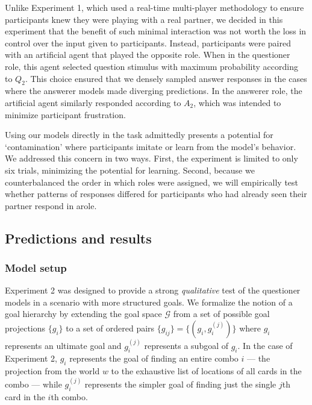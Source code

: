 \documentclass[11pt, floatsintext]{apa6}
\begin{document}
Unlike Experiment 1, which used a real-time multi-player methodology to ensure participants knew they were playing with a real partner, we decided in this experiment that the benefit of such minimal interaction was not worth the loss in control over the input given to participants.
Instead, participants were paired with an artificial agent that played the opposite role.
When in the questioner role, this agent selected question stimulus with maximum probability according to $Q_2$. 
This choice ensured that we densely sampled answer responses in the cases where the answerer models made diverging predictions.
In the answerer role, the artificial agent similarly responded according to $A_2$, which was intended to minimize participant frustration.

Using our models directly in the task admittedly presents a potential for `contamination' where participants imitate or learn from the model's behavior. 
We addressed this concern in two ways. 
First, the experiment is limited to only six trials, minimizing the potential for learning.
Second, because we counterbalanced the order in which roles were assigned, we will empirically test whether patterns of responses differed for participants who had already seen their partner respond in arole.

\subsection{Predictions and results}

\subsubsection{Model setup}

Experiment 2 was designed to provide a strong \emph{qualitative} test of the questioner models in a scenario with more structured goals.
We formalize the notion of a goal hierarchy by extending the goal space $\mathcal{G}$ from a set of possible goal projections $\{g_i\}$ to a set of ordered pairs $\{g_{ij}\} = \{(g_i, g_i^{(j)})\}$ where $g_i$ represents an ultimate goal and $g_i^{(j)}$ represents a subgoal of $g_i$. 
In the case of Experiment 2, $g_i$ represents the goal of finding an entire combo $i$ --- the projection from the world $w$ to the exhaustive list of locations of all cards in the combo --- while $g_i^{(j)}$ represents the simpler goal of finding just the single $j$th card in the $i$th combo. 
\end{document}
